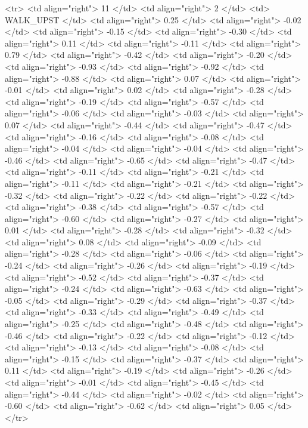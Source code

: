   <tr> <td align="right"> 11 </td> <td align="right">   2 </td> <td> WALK_UPST </td> <td align="right"> 0.25 </td> <td align="right"> -0.02 </td> <td align="right"> -0.15 </td> <td align="right"> -0.30 </td> <td align="right"> 0.11 </td> <td align="right"> -0.11 </td> <td align="right"> 0.79 </td> <td align="right"> -0.42 </td> <td align="right"> -0.20 </td> <td align="right"> -0.93 </td> <td align="right"> -0.92 </td> <td align="right"> -0.88 </td> <td align="right"> 0.07 </td> <td align="right"> -0.01 </td> <td align="right"> 0.02 </td> <td align="right"> -0.28 </td> <td align="right"> -0.19 </td> <td align="right"> -0.57 </td> <td align="right"> -0.06 </td> <td align="right"> -0.03 </td> <td align="right"> 0.07 </td> <td align="right"> -0.44 </td> <td align="right"> -0.47 </td> <td align="right"> -0.16 </td> <td align="right"> -0.08 </td> <td align="right"> -0.04 </td> <td align="right"> -0.04 </td> <td align="right"> -0.46 </td> <td align="right"> -0.65 </td> <td align="right"> -0.47 </td> <td align="right"> -0.11 </td> <td align="right"> -0.21 </td> <td align="right"> -0.11 </td> <td align="right"> -0.21 </td> <td align="right"> -0.32 </td> <td align="right"> -0.22 </td> <td align="right"> -0.22 </td> <td align="right"> -0.38 </td> <td align="right"> -0.57 </td> <td align="right"> -0.60 </td> <td align="right"> -0.27 </td> <td align="right"> 0.01 </td> <td align="right"> -0.28 </td> <td align="right"> -0.32 </td> <td align="right"> 0.08 </td> <td align="right"> -0.09 </td> <td align="right"> -0.28 </td> <td align="right"> -0.06 </td> <td align="right"> -0.24 </td> <td align="right"> -0.26 </td> <td align="right"> -0.19 </td> <td align="right"> -0.52 </td> <td align="right"> -0.37 </td> <td align="right"> -0.24 </td> <td align="right"> -0.63 </td> <td align="right"> -0.05 </td> <td align="right"> -0.29 </td> <td align="right"> -0.37 </td> <td align="right"> -0.33 </td> <td align="right"> -0.49 </td> <td align="right"> -0.25 </td> <td align="right"> -0.48 </td> <td align="right"> -0.46 </td> <td align="right"> -0.22 </td> <td align="right"> -0.12 </td> <td align="right"> -0.13 </td> <td align="right"> -0.08 </td> <td align="right"> -0.15 </td> <td align="right"> -0.37 </td> <td align="right"> 0.11 </td> <td align="right"> -0.19 </td> <td align="right"> -0.26 </td> <td align="right"> -0.01 </td> <td align="right"> -0.45 </td> <td align="right"> -0.44 </td> <td align="right"> -0.02 </td> <td align="right"> -0.60 </td> <td align="right"> -0.62 </td> <td align="right"> 0.05 </td> </tr>
